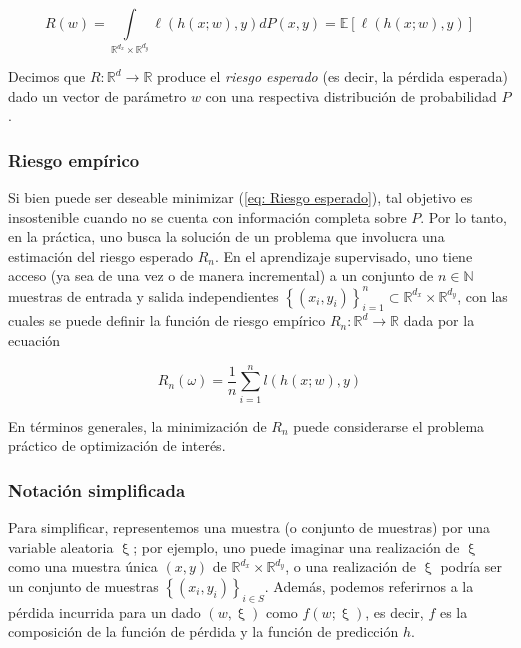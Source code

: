 \begin{equation}
\label{eq: Riesgo esperado}
R(w) = \int\limits_{\mathbb{R}^{d_x}\times \mathbb{R}^{d_y}} {\ell \left(h(x;w), y\right) dP(x,y)} = \mathbb{E} \left[ \ell \left( h(x;w), y \right) \right]
\end{equation}

Decimos que $R : \mathbb{R}^{d} \rightarrow \mathbb{R}$ produce el \textit{riesgo esperado} (es decir, la p\'erdida esperada) dado un vector de par\'ametro $w$ con una respectiva distribuci\'on de probabilidad $P$.

\subsubsection{Riesgo emp\'irico}
Si bien puede ser deseable minimizar (\ref{eq: Riesgo esperado}), tal objetivo es insostenible cuando no se cuenta con informaci\'on completa sobre $P$. Por lo tanto, en la pr\'actica, uno busca la soluci\'on de un problema que involucra una estimaci\'on del riesgo esperado $R_n$. En el aprendizaje supervisado, uno tiene acceso (ya sea de una vez o de manera incremental) a un conjunto de  $n \in \mathbb{N}$ muestras de entrada y salida independientes $\left\lbrace (x_i, y_i) \right\rbrace_{i=1}^{n} \subset \mathbb{R}^{d_x} \times \mathbb{R}^{d_y}$, con las cuales se puede definir la funci\'on de riesgo emp\'irico $R_n : \mathbb{R}^d \rightarrow \mathbb{R}$ dada por la ecuaci\'on 

\begin{equation}
\label{eq: Riesgo empirico}
R_n(\omega) = \frac{1}{n} \sum\limits_{i=1}^{n} {l \left( h(x;w), y\right)}
\end{equation}

En t\'erminos generales, la minimizaci\'on de $R_n$ puede considerarse el problema pr\'actico de optimizaci\'on de inter\'es. 

\subsubsection{Notaci\'on simplificada}
Para simplificar, representemos una muestra (o conjunto de muestras) por una variable aleatoria $\upxi$; por ejemplo, uno puede imaginar una realizaci\'on de $\upxi$ como una muestra \'unica $(x, y)$ de $\mathbb{R}^{d_x} \times \mathbb{R}^{d_y}$, o una realizaci\'on de $\upxi$ podr\'ia ser un conjunto de muestras $\left\lbrace(x_i, y_i)\right\rbrace_{i \in S}$. Adem\'as, podemos referirnos a la p\'erdida incurrida para un dado $(w, \upxi)$ como $f (w; \upxi )$, es decir, $f$ es la composici\'on de la funci\'on de p\'erdida y la funci\'on de predicci\'on $h$.

